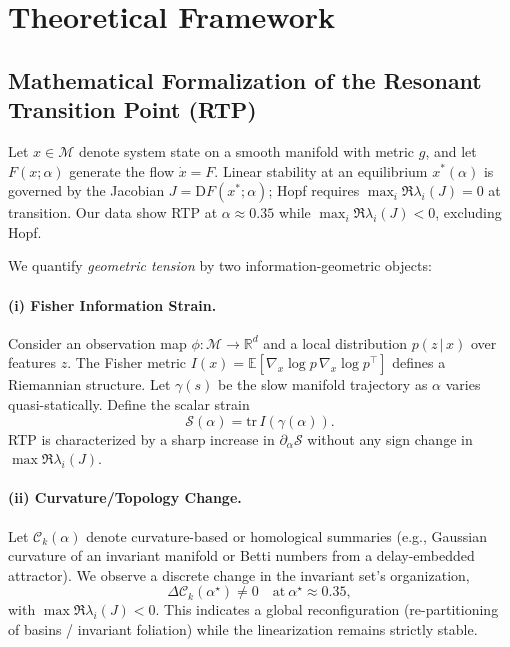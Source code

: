 \documentclass[11pt,twocolumn]{article}
\begin{document}
\section{Theoretical Framework}

\subsection{Mathematical Formalization of the Resonant Transition Point (RTP)}
\label{sec:rtp-formal}

Let $x\in\mathcal{M}$ denote system state on a smooth manifold with metric $g$, and let $F(x;\alpha)$ generate the flow $\dot{x}=F$. Linear stability at an equilibrium $x^\ast(\alpha)$ is governed by the Jacobian $J=\mathrm{D}F(x^\ast;\alpha)$; Hopf requires $\max_i \Re\lambda_i(J)=0$ at transition. Our data show RTP at $\alpha\approx0.35$ while $\max_i \Re\lambda_i(J)<0$, excluding Hopf.

We quantify \emph{geometric tension} by two information-geometric objects:

\paragraph{(i) Fisher Information Strain.}
Consider an observation map $\phi:\mathcal{M}\to\mathbb{R}^d$ and a local distribution $p(z\,|\,x)$ over features $z$. The Fisher metric $I(x)=\mathbb{E}[\nabla_x \log p \,\nabla_x \log p^\top]$ defines a Riemannian structure. Let $\gamma(s)$ be the slow manifold trajectory as $\alpha$ varies quasi-statically. Define the scalar strain
\[
\mathcal{S}(\alpha)=\mathrm{tr}\,I\!\left(\gamma(\alpha)\right).
\]
RTP is characterized by a sharp increase in $\partial_\alpha \mathcal{S}$ without any sign change in $\max \Re\lambda_i(J)$.

\paragraph{(ii) Curvature/Topology Change.}
Let $\mathcal{C}_k(\alpha)$ denote curvature-based or homological summaries (e.g., Gaussian curvature of an invariant manifold or Betti numbers from a delay-embedded attractor). We observe a discrete change in the invariant set's organization,
\[
\Delta \mathcal{C}_k(\alpha^\star)\neq 0\quad \text{at}\ \alpha^\star\approx 0.35,
\]
with $\max \Re\lambda_i(J)<0$. This indicates a global reconfiguration (re-partitioning of basins / invariant foliation) while the linearization remains strictly stable.
\end{document}
